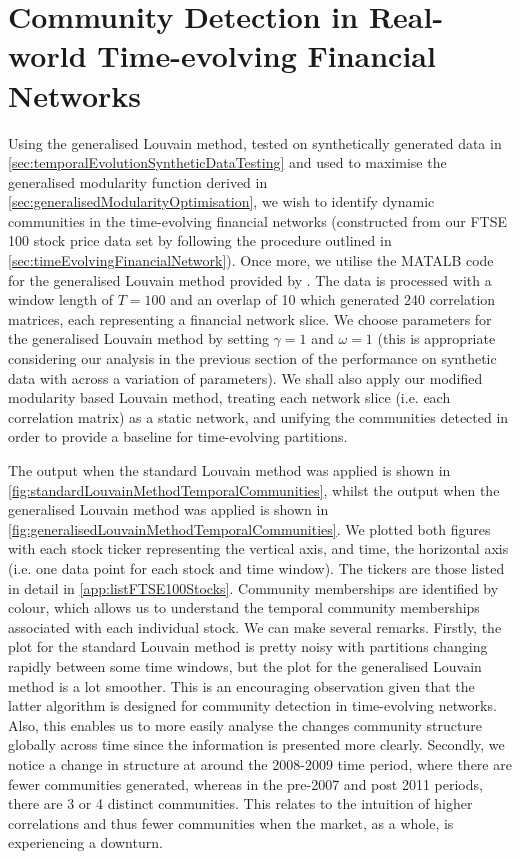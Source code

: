 
\section{Community Detection in Real-world Time-evolving  Financial Networks}
\label{sec:communityDetectionRealWorldTimeEvolvingFinancialNetworks}

Using the generalised Louvain method, tested on synthetically generated data in \cref{sec:temporalEvolutionSyntheticDataTesting} and used to maximise the generalised modularity function derived in \cref{sec:generalisedModularityOptimisation}, we wish to identify dynamic communities in the time-evolving financial networks (constructed from our FTSE 100 stock price data set by following the procedure outlined in \cref{sec:timeEvolvingFinancialNetwork}).
Once more, we utilise the MATALB code for the generalised Louvain method provided by \cite{GenLou}.
The data is processed with a window length of $T = 100$ and an overlap of 10 which generated 240 correlation matrices, each representing a financial network slice.
We choose parameters for the generalised Louvain method by setting $\gamma = 1$ and $\omega = 1$ (this is appropriate considering our analysis in the previous section of the performance on synthetic data with across a variation of parameters).
We shall also apply our modified modularity based Louvain method, treating each network slice (i.e. each correlation matrix) as a static network, and unifying the communities detected in order to provide a baseline for time-evolving partitions.

The output when the standard Louvain method was applied is shown in \cref{fig:standardLouvainMethodTemporalCommunities}, whilst the output when the generalised Louvain method was applied is shown in \cref{fig:generalisedLouvainMethodTemporalCommunities}.
We plotted both figures with each stock ticker representing the vertical axis, and time, the horizontal axis (i.e. one data point for each stock and time window).
The tickers are those listed in detail in \cref{app:listFTSE100Stocks}.
Community memberships are identified by colour, which allows us to understand the temporal community memberships associated with each individual stock.
We can make several remarks.
Firstly, the plot for the standard Louvain method is pretty noisy with partitions changing rapidly between some time windows, but the plot for the generalised Louvain method is a lot smoother.
This is an encouraging observation given that the latter algorithm is designed for community detection in time-evolving networks.
Also, this enables us to more easily analyse the changes community structure globally across time since the information is presented more clearly.
Secondly, we notice a change in structure at around the 2008-2009 time period, where there are fewer communities generated, whereas in the pre-2007 and post 2011 periods, there are 3 or 4 distinct communities.
This relates to the intuition of higher correlations and thus fewer communities when the market, as a whole, is experiencing a downturn.

